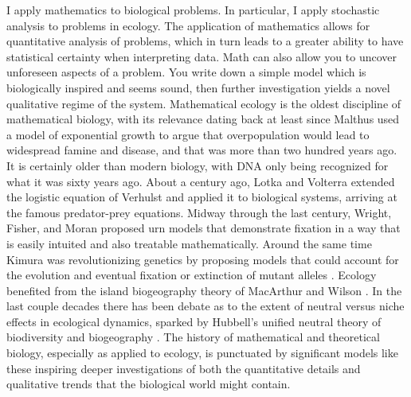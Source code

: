 I apply mathematics to biological problems. In particular, I apply stochastic analysis to problems in ecology. 
The application of mathematics allows for quantitative analysis of problems, which in turn leads to a greater ability to have statistical certainty when interpreting data. 
Math can also allow you to uncover unforeseen aspects of a problem. 
You write down a simple model which is biologically inspired and seems sound, then further investigation yields a novel qualitative regime of the system. 
Mathematical ecology is the oldest discipline of mathematical biology, with its relevance dating back at least since Malthus used a model of exponential growth to argue that overpopulation would lead to widespread famine and disease, and that was more than two hundred years ago. 
It is certainly older than modern biology, with DNA only being recognized for what it was sixty years ago. 
About a century ago, Lotka and Volterra extended the logistic equation of Verhulst and applied it to biological systems, arriving at the famous predator-prey equations. 
Midway through the last century, Wright, Fisher, and Moran proposed urn models that demonstrate fixation in a way that is easily intuited and also treatable mathematically. %
Around the same time Kimura was revolutionizing genetics by proposing models that could account for the evolution and eventual fixation or extinction of mutant alleles \cite{Crow1956,Kimura1964}. 
Ecology benefited from the island biogeography theory of MacArthur and Wilson \cite{MacArthur1963,MacArthur1967}. 
In the last couple decades there has been debate as to the extent of neutral versus niche effects in ecological dynamics, sparked by Hubbell’s unified neutral theory of biodiversity and biogeography \cite{Hubbell2001}. 
The history of mathematical and theoretical biology, especially as applied to ecology, is punctuated by significant models like these inspiring deeper investigations of both the quantitative details and qualitative trends that the biological world might contain. 


